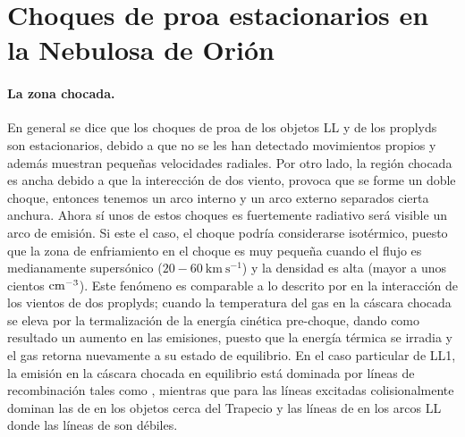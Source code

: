 \section{Choques de proa estacionarios en la Nebulosa de Orión}
\label{sec:shocks}

\paragraph{La zona chocada.} En general se dice que los choques de proa de los objetos LL y de los proplyds son estacionarios, debido a que no se les han detectado movimientos propios y además muestran pequeñas velocidades radiales. Por otro lado, la región chocada es ancha debido a que la interección de dos viento, provoca que se forme un doble choque, entonces tenemos un arco interno y un arco externo separados cierta anchura. Ahora sí unos de estos choques es fuertemente radiativo será visible un arco de emisión. Si este el caso, el choque podría considerarse isotérmico, puesto que la zona de enfriamiento en el choque es muy pequeña cuando el flujo es medianamente supersónico (\(20-60~\text{km}~\text{s}^{-1}\)) y la densidad es alta (mayor a unos cientos \(\mathrm{cm}^{-3}\)). Este fenómeno es comparable a lo descrito por \citet{Henney:2002} en la interacción de los vientos de dos proplyds; cuando la temperatura del gas en la cáscara chocada se eleva por la termalización de la energía cinética pre-choque, dando como resultado un aumento en las emisiones, puesto que la energía térmica se irradia y el gas retorna nuevamente a su estado de equilibrio. En el caso particular de LL1, la emisión en la cáscara chocada en equilibrio está dominada por líneas de recombinación tales como \ha{}, mientras que para las líneas excitadas colisionalmente dominan las de \oiii{} en los objetos cerca del Trapecio y las líneas de \nii{} en los arcos LL donde las líneas de \oiii{} son débiles.\\ 

